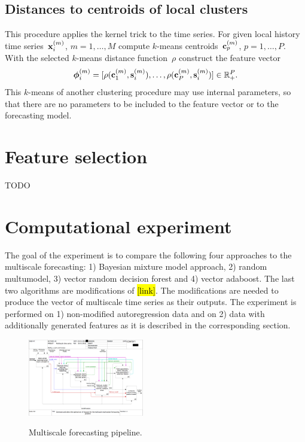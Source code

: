 \documentclass[conference]{IEEEtran}
\begin{document}
\subsection{Distances to centroids of local clusters}
This procedure applies the kernel trick to the time series. For given local history time series~${\mathbf{x}}_i^{(m)}$, $m=1,\dots, M$ compute $k$-means centroids~${\mathbf{c}}_p^{(m)}$, $p = 1, \dots, P$.  With the selected $k$-means distance function~$\rho$ construct the feature vector
\[
{\boldsymbol{\phi}}_i^{(m)} = [\rho({\mathbf{c}}_1^{(m)},{\mathbf{s}}_i^{(m)}),\dots,\rho({\mathbf{c}}^{(m)}_P,{\mathbf{s}}_i^{(m)})] \in \mathbb{R}_+^P.
\]
This $k$-means of another clustering procedure may use internal parameters, so that there are no parameters to be included to the feature vector or to the forecasting model.



\section{Feature selection}
TODO



\section{Computational experiment}
The goal of the experiment is to compare the following four approaches to the multiscale forecasting:
1) Bayesian mixture model approach,
2) random multumodel,
3) vector random decision forest and
4) vector adaboost.
The last two algorithms are modifications of \hl{[link]}. The modifications are needed to produce the vector of multiscale time series as their outputs. The experiment is performed on 1) non-modified autoregression data and on 2) data with additionally generated features as it is described in the corresponding section.

\begin{figure}[!t]
\centering\includegraphics[width=0.45\textwidth]{02_A0.png}
\label{fg:IDEF}
\caption{Multiscale forecasting pipeline.}
\end{figure}

\nocite{*}

\end{document}
